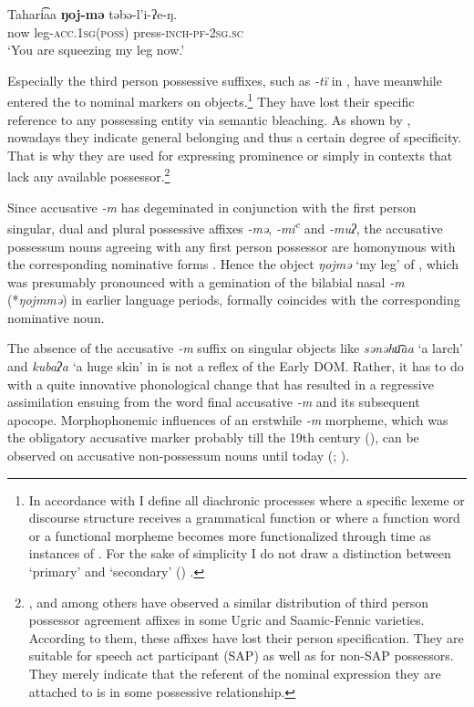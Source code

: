 \documentclass[output=paper]{LSP/langsci}
\begin{document}
\ex \label{12-wr-ex:1b}
\gll Tahari͡aa \textbf{ŋoj-mə} təbə-l’i-ʔe-ŋ.\\
 now leg-\textsc{acc.1sg(poss)} press-\textsc{inch-pf-2sg.sc}\\
\glt ‘You are squeezing my leg now.’ %
\z
\z
 
Especially the third person possessive suffixes, such as \textit{-tï} in , have meanwhile entered the  to nominal  markers on objects.\footnote{In accordance with \citet[2]{Hopperetal1993Grammaticalization} I define all diachronic processes where a specific lexeme or discourse structure receives a grammatical function or where a function word or a functional morpheme becomes more functionalized through time as instances of . For the sake of simplicity I do not draw a distinction between ‘primary’ and ‘secondary’ (\cf \citealt{Traugott2004Exaptation}) .} They have lost their specific reference to any possessing entity via semantic bleaching. As shown by \citet{Gerland2014Possessive}, nowadays they  indicate general belonging and thus a certain degree of specificity. 
That is why they are used for expressing prominence or simply  in contexts that lack any available possessor.\footnote{\citet{Toivonen1998Lexical}, \citet{Bartos1999Morfoszintaxis} and \citet{Dekany2015Syntax} among others have observed a similar distribution of third person possessor agreement affixes in some Ugric and Saamic-Fennic varieties. According to them, these affixes have lost their person specification. They are suitable for speech act participant (SAP) as well as for non-SAP possessors. They merely indicate that the referent of the nominal expression they are attached to is in some possessive relationship.} 

Since accusative \textit{-m} has degeminated in conjunction with the first person singular, dual and plural possessive affixes \textit{-mǝ}, \textit{-mi\textsuperscript{c}} and \textit{-muʔ}, the accusative possessum nouns agreeing with any first person possessor are homonymous with the corresponding nominative forms \citep{Salminen1996Comments}. Hence the object \textit{ŋojmə} ‘my leg’ of , which was presumably pronounced with a gemination of the bilabial nasal \textit{-m} (*\textit{ŋojmmə}) in earlier language periods, formally coincides with the corresponding nominative noun.

The absence of the accusative \textit{-m} suffix on  singular objects like \textit{sənəhu͡aa} ‘a larch’ and \textit{kubaʔa} ‘a huge skin’ in  is not a reflex of the Early  DOM. 
Rather, it has to do with a quite innovative phonological change that has resulted in a regressive assimilation ensuing from the word final accusative \textit{-m} and its subsequent apocope. 
Morphophonemic influences of an erstwhile \textit{-m} morpheme, which was the obligatory accusative marker probably till the 19th century (\cf \citealt[156]{Castren1845Grammatik}), can be observed on  accusative non-possessum nouns until today (\citealt[71--89]{WagnerNagy2002Chrestomathia}; \citealt[357--365]{Katzschmann2008Chrestomathia}). 
\end{document}
